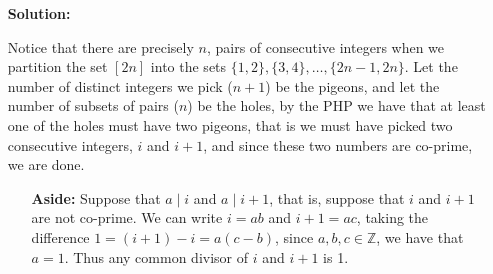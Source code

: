 \documentclass[twoside]{article}
\theoremstyle{mystyle}
\begin{document}
\begin{enumerate}

\item[{\bfseries Solution:}] 

Notice that there are precisely $n$, pairs of consecutive integers when we partition the set $[2n]$ into the sets $\{1,2\}, \{3,4\}, \ldots, \{2n-1, 2n\}$. Let the number of distinct integers we pick ($n+1$) be the pigeons, and let the number of subsets of pairs ($n$) be the holes, by the PHP we have that at least one of the holes must have two pigeons, that is we must have picked two consecutive integers, $i$ and $i + 1$, and since these two numbers are co-prime, we are done. 

\begin{enumerate}

\item[{\bfseries Aside:}] Suppose that $a \mid i$ and $a \mid i + 1$, that is, suppose that $i$ and $i +1$ are not co-prime. We can write $i = ab$ and $i + 1 = ac$, taking the difference $1 = (i + 1) - i = a(c-b)$, since $a, b, c \in \mathbb{Z}$, we have that $a = 1$. Thus any common divisor of $i$ and $i+1$ is 1. 

\end{enumerate}
\end{enumerate}
\end{document}
